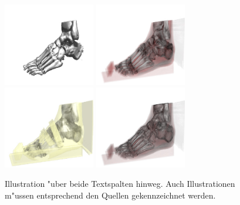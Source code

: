 \documentclass[journal]{vgtc}
\begin{document}
\begin{figure}[tb]
  \centering
  \includegraphics[width=4cm]{images/foot1}\hfill
  \includegraphics[width=4cm]{images/foot2}\hfill
  \includegraphics[width=4cm]{images/foot3}\hfill
  \includegraphics[width=4cm]{images/foot4}
  \caption{Illustration "uber beide Textspalten hinweg. Auch
    Illustrationen m"ussen entsprechend den Quellen gekennzeichnet
    werden. \cite{strengert2006spectral}}
  \label{fig:multicolumn}
\end{figure}






\end{document}
